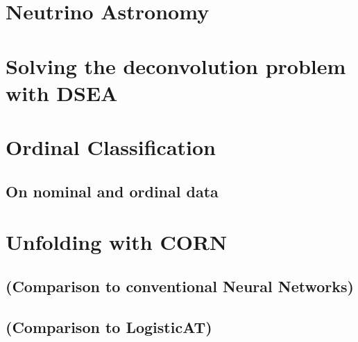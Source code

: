 
\chapter{Neutrino Astronomy}
  
  
  
\chapter{Solving the deconvolution problem with DSEA}
  
  
  
\chapter{Ordinal Classification}
  
  \section{On nominal and ordinal data}
  \blindtext[3]
  
\chapter{Unfolding with CORN}
  
  
  
  
  
  
  \section{(Comparison to conventional Neural Networks)}
  \section{(Comparison to LogisticAT)}

